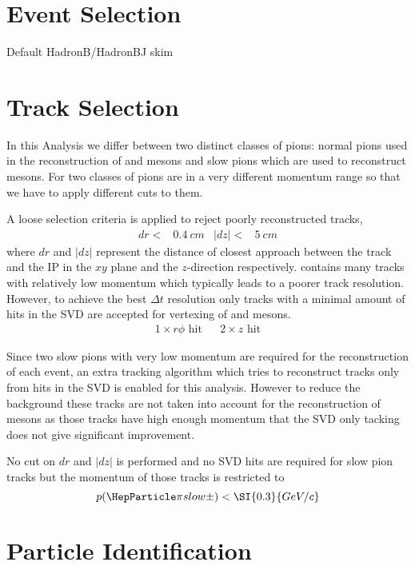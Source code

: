 \documentclass[a4paper]{report}
\begin{document}
\section{\bbar Event Selection}
Default HadronB/HadronBJ skim

\section{Track Selection}
\label{sec:trackselection}

In this Analysis we differ between two distinct classes of pions: normal pions
used in the reconstruction of \PD and \PKzS mesons and slow pions which are used
to reconstruct \PDst mesons. For two classes of pions are in a very different
momentum range so that we have to apply different cuts to them.

A loose selection criteria is applied to reject poorly reconstructed tracks,
\begin{align*}
    dr <& \SI{0.4}{cm}& |dz| <&\SI{5}{cm}
\end{align*}
where $dr$ and $|dz|$ represent the distance of closest approach between the
track and the IP in the $xy$ plane and the $z$-direction respectively. \ddk
contains many tracks with relatively low momentum which typically leads to a
poorer track resolution. However, to achieve the best $\Delta t$ resolution only
tracks with a minimal amount of hits in the SVD are accepted for vertexing of
\PD and \PBz mesons.
\begin{align*}
    1\times r\phi \text{ hit}&& 2\times z \text{ hit}
\end{align*}

Since two slow pions with very low momentum are required for the reconstruction
of each event, an extra tracking algorithm which tries to reconstruct tracks
only from hits in the SVD is enabled for this analysis. However to reduce the
background these tracks are not taken into account for the reconstruction of
\PD mesons as those tracks have high enough momentum that the SVD only tacking
does not give significant improvement.

No cut on $dr$ and $|dz|$ is performed and no SVD hits are required for slow
pion tracks but the momentum of those tracks is restricted to
\[ p(\Pgppms) < \SI{0.3}{GeV/c} \]

\section{Particle Identification}
\end{document}
